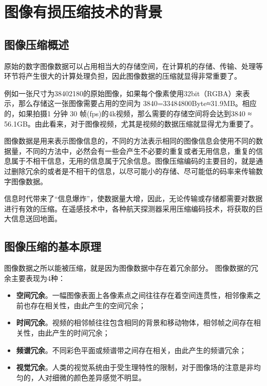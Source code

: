 \chapter{图像有损压缩技术的背景}

\section{图像压缩概述}

原始的数字图像数据可以占用相当大的存储空间，在计算机的存储、传输、处理等环节将产生很大的计算处理负担，因此图像数据的压缩就显得非常重要了。

例如一张尺寸为3840\times2180的原始图像，如果每个像素使用32bit（RGBA）来表示，那么存储这一张图像需要占用的空间为 3840=33484800Byte≈31.9MB。相应的，如果拍摄1 分钟 30 帧(fps)的4k视频，那么需要的存储空间将会达到3840 ≈ 56.1GB。由此看来，对于图像视频，尤其是视频的数据压缩就显得尤为重要了。

图像数据是用来表示图像信息的，不同的方法表示相同的图像信息会使用不同的数据量，不同的方法中，必然会有一些会产生不必要的重复或者无用信息，重复的信息属于不相干信息，无用的信息属于冗余信息。图像压缩编码的主要目的，就是通过删除冗余的或者是不相干的信息，以尽可能小的存储、尽可能低的码率来传输数字图像数据。

信息时代带来了“信息爆炸”，使数据量大增，因此，无论传输或存储都需要对数据进行有效的压缩。在遥感技术中，各种航天探测器采用压缩编码技术，将获取的巨大信息送回地面。


\section{图像压缩的基本原理}

图像数据之所以能被压缩，就是因为图像数据中存在着冗余部分。
图像数据的冗余主要表现为4种：
\begin{itemize}
    \item \textbf{空间冗余}。一幅图像表面上各像素点之间往往存在着空间连贯性，相邻像素之前也存在相关性，由此产生的空间冗余；
    \item \textbf{时间冗余}。视频的相邻帧往往包含相同的背景和移动物体，相邻帧之间存在相关性，由此产生的时间冗余；
    \item \textbf{频谱冗余}。不同彩色平面或频谱带之间存在相关，由此产生的频谱冗余；
    \item \textbf{视觉冗余}。人类的视觉系统由于受生理特性的限制，对于图像场的注意是非均匀的，人对细微的颜色差异感觉不明显。
\end{itemize}

